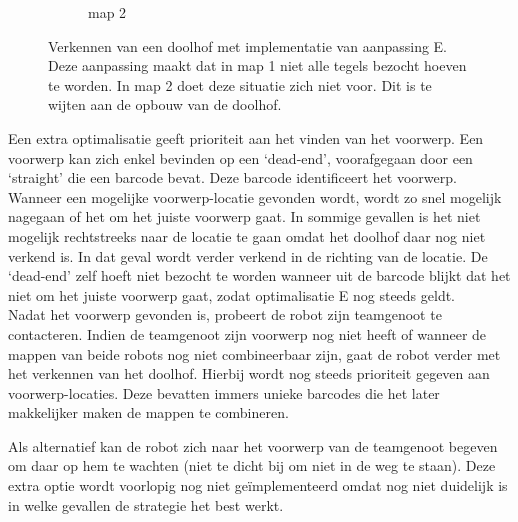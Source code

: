 \documentclass[tt1]{penoverslag}
\begin{document}
\begin{figure}
\begin{subfigure}[hb]{0.36\textwidth}
	\caption{map 2}
\end{subfigure}
\caption[Verkennen van een doolhof]{Verkennen van een doolhof met implementatie van aanpassing E. Deze aanpassing maakt dat in map 1 niet alle tegels bezocht hoeven te worden. In map 2 doet deze situatie zich niet voor. Dit is te wijten aan de opbouw van de doolhof.}
\label{fig:resultVerkenE}
\end{figure}

Een extra optimalisatie geeft prioriteit aan het vinden van het voorwerp. Een voorwerp kan zich enkel bevinden op een `dead-end', voorafgegaan door een `straight' die een barcode bevat. Deze barcode identificeert het voorwerp. Wanneer een mogelijke voorwerp-locatie gevonden wordt, wordt zo snel mogelijk nagegaan of het om het juiste voorwerp gaat. In sommige gevallen is het niet mogelijk rechtstreeks naar de locatie te gaan omdat het doolhof daar nog niet verkend is. In dat geval wordt verder verkend in de richting van de locatie. De `dead-end' zelf hoeft niet bezocht te worden wanneer uit de barcode blijkt dat het niet om het juiste voorwerp gaat, zodat optimalisatie E nog steeds geldt.\\

Nadat het voorwerp gevonden is, probeert de robot zijn teamgenoot te contacteren. Indien de teamgenoot zijn voorwerp nog niet heeft of wanneer de mappen van beide robots nog niet combineerbaar zijn, gaat de robot verder met het verkennen van het doolhof. Hierbij wordt nog steeds prioriteit gegeven aan voorwerp-locaties. Deze bevatten immers unieke barcodes die het later makkelijker maken de mappen te combineren.

Als alternatief kan de robot zich naar het voorwerp van de teamgenoot begeven om daar op hem te wachten (niet te dicht bij om niet in de weg te staan). Deze extra optie wordt voorlopig nog niet ge\"implementeerd omdat nog niet duidelijk is in welke gevallen de strategie het best werkt.

\end{document}
